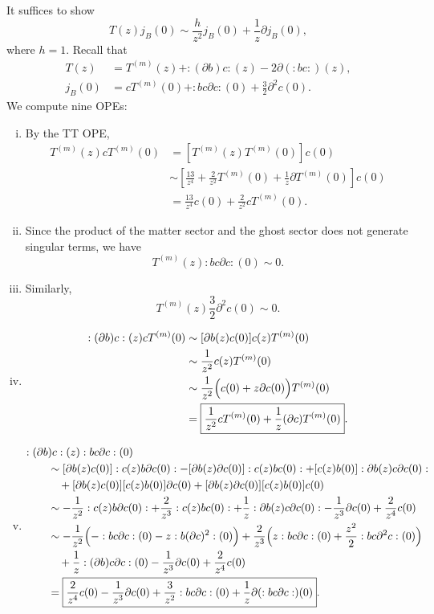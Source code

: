 \documentclass{../../../small}
\begin{document}
\begin{pf}[Solution of (2)]
It suffices to show
\[T(z)j_B(0)\sim\frac h{z^2}j_B(0)+\frac1z\partial j_B(0),\]
where $h=1$.
Recall that
\begin{align*}
T(z)&=T^{(m)}(z)+:(\partial b)c:(z)-2\partial(:bc:)(z),\\
j_B(0)&=cT^{(m)}(0)+:bc\partial c:(0)+\frac32\partial^2c(0).
\end{align*}
We compute nine OPEs:

\begin{enumerate}[(i)]
\item
By the TT OPE,
\begin{align*}
T^{(m)}(z)cT^{(m)}(0)
&=[T^{(m)}(z)T^{(m)}(0)]c(0)\\
&\sim\left[\frac{13}{z^4}+\frac2{z^2}T^{(m)}(0)+\frac1z\partial T^{(m)}(0)\right]c(0)\\
&=\boxed{\frac{13}{z^4}c(0)+\frac2{z^2}cT^{(m)}(0)}.
\end{align*}

\item
Since the product of the matter sector and the ghost sector does not generate singular terms, we have
\[T^{(m)}(z):bc\partial c:(0)\sim\boxed{0}.\]

\item
Similarly,
\[T^{(m)}(z)\frac32\partial^2c(0)\sim\boxed{0}.\]

\item
\begin{align*}
:(\partial b)c:(z)cT^{(m)}(0)
&\sim[\partial b(z)c(0)]c(z)T^{(m)}(0)\\
&\sim\frac1{z^2}c(z)T^{(m)}(0)\\
&\sim\frac1{z^2}\Bigl(c(0)+z\partial c(0)\Bigr)T^{(m)}(0)\\
&=\boxed{\frac1{z^2}cT^{(m)}(0)+\frac1z(\partial c)T^{(m)}(0)}.
\end{align*}

\item
\begin{align*}
:(\partial b&)c:(z):bc\partial c:(0)\\
&\sim[\partial b(z)c(0)]:c(z)b\partial c(0):-[\partial b(z)\partial c(0)]:c(z)bc(0):+[c(z)b(0)]:\partial b(z)c\partial c(0):\\
&\quad+[\partial b(z)c(0)][c(z)b(0)]\partial c(0)+[\partial b(z)\partial c(0)][c(z)b(0)]c(0)\\
&\sim-\frac1{z^2}:c(z)b\partial c(0):+\frac2{z^3}:c(z)bc(0):+\frac1z:\partial b(z)c\partial c(0):-\frac1{z^3}\partial c(0)+\frac2{z^4}c(0)\\
&\sim-\frac1{z^2}\Bigl(-:bc\partial c:(0)-z:b(\partial c)^2:(0)\Bigr)+\frac2{z^3}\Bigl(z:bc\partial c:(0)+\frac{z^2}2:bc\partial^2 c:(0)\Bigr)\\
&\quad+\frac1z:(\partial b)c\partial c:(0)-\frac1{z^3}\partial c(0)+\frac2{z^4}c(0)\\
&=\boxed{\frac2{z^4}c(0)-\frac1{z^3}\partial c(0)+\frac3{z^2}:bc\partial c:(0)+\frac1z\partial(:bc\partial c:)(0)}.
\end{align*}


\end{enumerate}
\end{pf}
\end{document}
